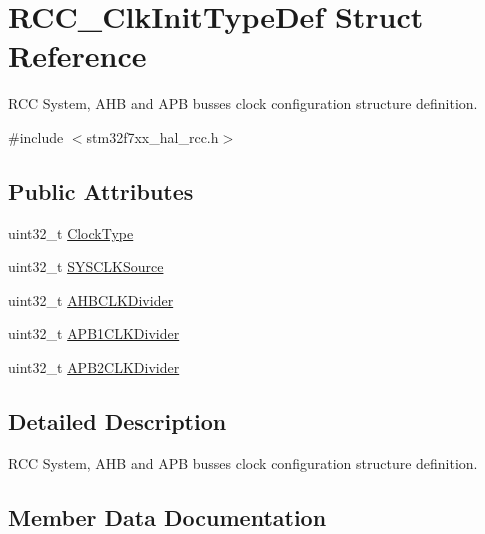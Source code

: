 \hypertarget{struct_r_c_c___clk_init_type_def}{}\section{R\+C\+C\+\_\+\+Clk\+Init\+Type\+Def Struct Reference}
\label{struct_r_c_c___clk_init_type_def}


R\+CC System, A\+HB and A\+PB busses clock configuration structure definition.  




{\ttfamily \#include $<$stm32f7xx\+\_\+hal\+\_\+rcc.\+h$>$}

\subsection*{Public Attributes}
\begin{DoxyCompactItemize}
\item 
uint32\+\_\+t \mbox{\hyperlink{struct_r_c_c___clk_init_type_def_a93a53676a1cfc5b55b8b990e7ff4dac5}{Clock\+Type}}
\item 
uint32\+\_\+t \mbox{\hyperlink{struct_r_c_c___clk_init_type_def_a4ceff1fdbf423e347c63052ca2c1d7e1}{S\+Y\+S\+C\+L\+K\+Source}}
\item 
uint32\+\_\+t \mbox{\hyperlink{struct_r_c_c___clk_init_type_def_abd9bcaa8dcf4b816462ee2930ab3e993}{A\+H\+B\+C\+L\+K\+Divider}}
\item 
uint32\+\_\+t \mbox{\hyperlink{struct_r_c_c___clk_init_type_def_a21ceb024102adc3c4dc7eb270cf02ebd}{A\+P\+B1\+C\+L\+K\+Divider}}
\item 
uint32\+\_\+t \mbox{\hyperlink{struct_r_c_c___clk_init_type_def_aa75c110cd93855d49249f38da8cf94f7}{A\+P\+B2\+C\+L\+K\+Divider}}
\end{DoxyCompactItemize}


\subsection{Detailed Description}
R\+CC System, A\+HB and A\+PB busses clock configuration structure definition. 



\subsection{Member Data Documentation}
\mbox{\label{struct_r_c_c___clk_init_type_def_abd9bcaa8dcf4b816462ee2930ab3e993}} 
